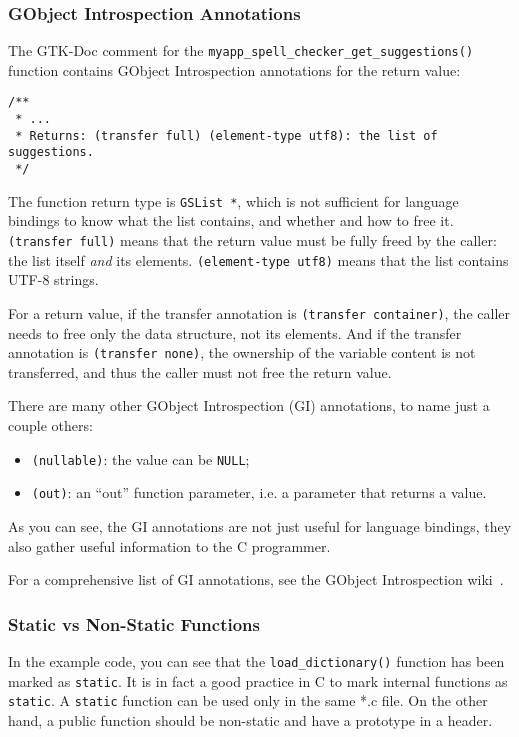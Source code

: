 \subsubsection{GObject Introspection Annotations}
The GTK-Doc comment for the \lstinline{myapp_spell_checker_get_suggestions()} function contains GObject Introspection annotations for the return value:
\begin{lstlisting}
/**
 * ...
 * Returns: (transfer full) (element-type utf8): the list of suggestions.
 */
\end{lstlisting}

The function return type is \lstinline{GSList *}, which is not sufficient for language bindings to know what the list contains, and whether and how to free it. \texttt{(transfer full)} means that the return value must be fully freed by the caller: the list itself \emph{and} its elements. \texttt{(element-type utf8)} means that the list contains UTF-8 strings.

For a return value, if the transfer annotation is \texttt{(transfer container)}, the caller needs to free only the data structure, not its elements. And if the transfer annotation is \texttt{(transfer none)}, the ownership of the variable content is not transferred, and thus the caller must not free the return value.

There are many other GObject Introspection (GI) annotations, to name just a couple others:
\begin{itemize}
  \item \texttt{(nullable)}: the value can be \lstinline{NULL};
  \item \texttt{(out)}: an ``out'' function parameter, i.e. a parameter that returns a value.
\end{itemize}

As you can see, the GI annotations are not just useful for language bindings, they also gather useful information to the C programmer.

For a comprehensive list of GI annotations, see the GObject Introspection wiki~\cite{gobject-introspection}.

\subsubsection{Static vs Non-Static Functions}
In the example code, you can see that the \lstinline{load_dictionary()} function has been marked as \lstinline{static}. It is in fact a good practice in C to mark internal functions as \lstinline{static}. A \lstinline{static} function can be used only in the same *.c file. On the other hand, a public function should be non-static and have a prototype in a header.

